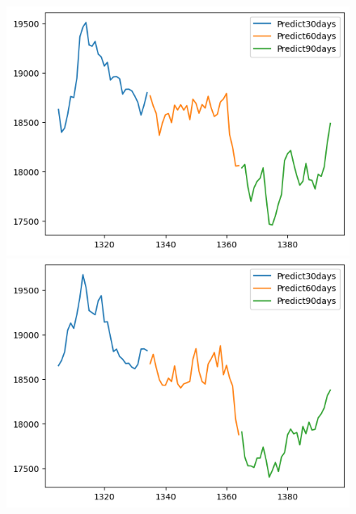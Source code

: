 \begin{figure}[H]
\begin{minipage}{0.15\textwidth}
    \includegraphics[width=1\textwidth]{resources/chapter-5/newdata1/predicted/EIB_NBeats_7-3_30days.png}
    \end{minipage}
    \hfill
    \begin{minipage}{0.15\textwidth}
    \centering
    \includegraphics[width=1\textwidth]{resources/chapter-5/newdata1/predicted/EIB_NBeats_8-2_30days.png}
    \end{minipage}
    \hfill
        \begin{minipage}{0.15\textwidth}
    \centering

\end{minipage}
\end{figure}
